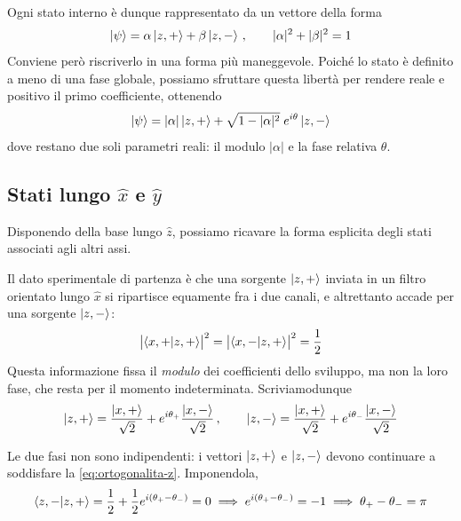 Ogni stato interno è dunque rappresentato da un vettore della forma
%
\begin{equation}
    \ket{\psi} = \alpha \ket{z, +} + \beta \ket{z, -}
    \, , \qquad |\alpha|^2 + |\beta|^2 = 1
    \label{eq:stato-interno}
\end{equation}
%
Conviene però riscriverlo in una forma più maneggevole. Poiché lo stato è definito a meno di una fase globale, possiamo sfruttare questa libertà per rendere reale e positivo il primo coefficiente, ottenendo
%
\begin{equation}
    \ket{\psi} = |\alpha| \ket{z, +}
    + \sqrt{1 - |\alpha|^2} \; e^{i \theta} \ket{z, -}
    \label{eq:stato-interno-ridotto}
\end{equation}
%
dove restano due soli parametri reali: il modulo $|\alpha|$ e la fase relativa $\theta$.

\subsection*{Stati lungo $\hat{x}$ e $\hat{y}$}

Disponendo della base lungo $\hat{z}$, possiamo ricavare la forma esplicita degli stati associati agli altri assi.

Il dato sperimentale di partenza è che una sorgente $\ket{z, +}$ inviata in un filtro orientato lungo $\hat{x}$ si ripartisce equamente fra i due canali, e altrettanto accade per una sorgente $\ket{z, -}$:
%
\begin{equation*}
    \bigl| \braket{x, + |z, +} \bigr|^2 = \bigl| \braket{x, - |z, +} \bigr|^2 = \frac{1}{2}
\end{equation*}
%
Questa informazione fissa il \emph{modulo} dei coefficienti dello sviluppo, ma non la loro fase, che resta per il momento indeterminata. Scriviamodunque
%
\begin{equation*}
    \ket{z,+} = \frac{\ket{x,+}}{\sqrt{2}}
    + e^{i\theta_+} \frac{\ket{x,-}}{\sqrt{2}}
    \, , \qquad
    \ket{z,-} = \frac{\ket{x,+}}{\sqrt{2}}
    + e^{i\theta_-} \frac{\ket{x,-}}{\sqrt{2}}
\end{equation*}

Le due fasi non sono indipendenti: i vettori $\ket{z,+}$ e $\ket{z,-}$ devono continuare a soddisfare la \eqref{eq:ortogonalita-z}. Imponendola,
%
\begin{equation*}
    \braket{z,-|z,+} = \frac{1}{2} + \frac{1}{2} e^{i(\theta_+ - \theta_-)} = 0 \implies e^{i(\theta_+ - \theta_-)} = -1 \implies \theta_+ - \theta_- = \pi
\end{equation*}

